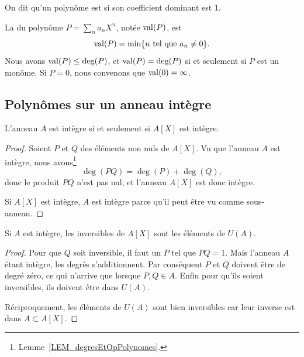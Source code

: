 \begin{definition}    \label{DEF_polynUnitaire}
  On dit qu'un polynôme est  si son coefficient dominant est 1.
\end{definition}

\begin{definition}
  La  du polynôme \( P=\sum_n a_nX^n\), notée \( \operatorname{val}(P)\), est
\begin{equation}
    \operatorname{val}(P)=\min\{ n\text{ tel que } a_n\neq 0 \}.
\end{equation}
  Nous avons \( \operatorname{val}(P)\leq \deg(P)\), et \( \operatorname{val}(P)=\deg(P)\) si et seulement si \( P\) est un monôme. Si \( P=0\), nous convenons que \( \operatorname{val}(0)=\infty\).
\end{definition}


\subsection{Polynômes sur un anneau intègre}


\begin{theorem}     \label{ThoBUEDrJ}
    L'anneau \( A\) est intègre si et seulement si \( A[X]\) est intègre.
\end{theorem}

\begin{proof}
    Soient \( P\) et \( Q\) des éléments non nuls de \( A[X]\). Vu que l'anneau \( A\) est intègre, nous avons\footnote{Lemme~\ref{LEM_degresEtOpPolynomes}.}
    \begin{equation}
        \deg(PQ)=\deg(P)+\deg(Q),
    \end{equation}
    donc le produit \( PQ \) n'est pas nul, et l'anneau \( A[X]\) est donc intègre.

    Si \( A[X]\) est intègre, \( A\) est intègre parce qu'il peut être vu comme sous-anneau.
\end{proof}

\begin{corollary}
    Si \( A\) est intègre, les inversibles de \( A[X]\) sont les éléments de \( U(A)\).
\end{corollary}

\begin{proof}
    Pour que \( Q\) soit inversible, il faut un \( P\) tel que \( PQ=1\). Mais l'anneau \( A\) étant intègre, les degrés s'additionnent. Par conséquent \( P \) et \( Q \) doivent être de degré zéro, ce qui n'arrive que lorsque \( P,Q\in A\). Enfin pour qu'ils soient inversibles, ils doivent être dans \( U(A)\).
    
    Réciproquement, les éléments de \( U(A)\) sont bien inversibles car leur inverse est dans \( A \subset A[X] \).
\end{proof}


